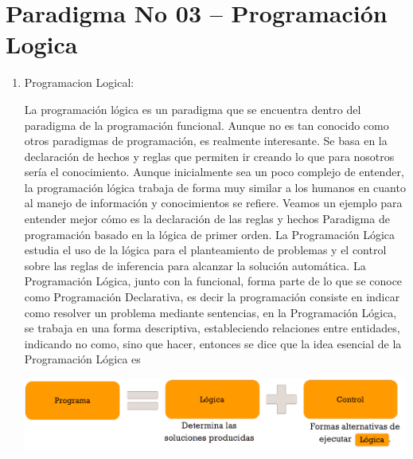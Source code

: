 
\section{Paradigma No 03 – Programación Logica} 

\begin{enumerate}[1.]
	\item Programacion Logical:

La programación lógica es un paradigma que se encuentra dentro del paradigma de la programación funcional. Aunque no es tan conocido como otros paradigmas de programación, es realmente interesante. Se basa en la declaración de hechos y reglas que permiten ir creando lo que para nosotros sería el conocimiento. Aunque inicialmente sea un poco complejo de entender, la programación lógica trabaja de forma muy similar a los humanos en cuanto al manejo de información y conocimientos se refiere. Veamos un ejemplo para entender mejor cómo es la declaración de las reglas y hechos
Paradigma de programación basado en la lógica de primer orden. La Programación Lógica estudia el uso de la lógica para el planteamiento de problemas y el control sobre las reglas de inferencia para alcanzar la solución automática.
La Programación Lógica, junto con la funcional, forma parte de lo que se conoce como Programación Declarativa, es decir la programación consiste en indicar como resolver un problema mediante sentencias, en la Programación Lógica, se trabaja en una forma descriptiva, estableciendo relaciones entre entidades, indicando no como, sino que hacer, entonces se dice que la idea esencial de la Programación Lógica es

\begin{center}
\includegraphics[scale=0.40]{./Imagenes/img02.png} 
\end{center}


\end{enumerate}

